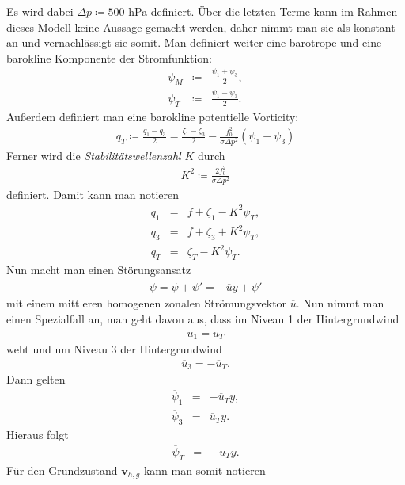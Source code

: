 \documentclass{book}
\newcommand\newoverline[1]{%
\overline{#1}}
\begin{document}
%
Es wird dabei $\Delta p \coloneqq500$ hPa definiert. Über die letzten Terme kann im Rahmen dieses Modell keine Aussage gemacht werden, daher nimmt man sie als konstant an und vernachlässigt sie somit. Man definiert weiter eine barotrope und eine barokline Komponente der Stromfunktion:
%
\begin{eqnarray}
\psi_M& \coloneqq&\frac{\psi_1 + \psi_3}{2},\\
\psi_T& \coloneqq&\frac{\psi_1 - \psi_3}{2}.
\end{eqnarray}
%
Außerdem definiert man eine barokline potentielle Vorticity:
%
\begin{eqnarray}
q_T \coloneqq\frac{q_1 - q_3}{2} = \frac{\zeta_1 - \zeta_3}{2} - \frac{f_0^2}{\sigma\Delta p^2}\left(\psi_1 - \psi_3\right)
\end{eqnarray}
%
Ferner wird die \textit{Stabilitätswellenzahl} $K$ durch
%
\begin{eqnarray}
K^2 \coloneqq\frac{2f_0^2}{\sigma\Delta p^2}
\end{eqnarray}
%
definiert. Damit kann man notieren
%
\begin{eqnarray}
q_1 & = & f + \zeta_1 - K^2\psi_T,\\
q_3 & = & f + \zeta_3 + K^2\psi_T,\\
q_T & = & \zeta_T - K^2\psi_T.
\end{eqnarray}
%
Nun macht man einen Störungsansatz
%
\begin{eqnarray}
\psi = \newoverline{\psi} + \psi' = -\newoverline{u}y + \psi'
\end{eqnarray}
%
mit einem mittleren homogenen zonalen Strömungsvektor $\newoverline{u}$. Nun nimmt man einen Spezialfall an, man geht davon aus, dass im Niveau 1 der Hintergrundwind
%
\begin{eqnarray}
\newoverline{u}_1 = \newoverline{u}_T
\end{eqnarray}
%
weht und um Niveau 3 der Hintergrundwind
%
\begin{eqnarray}
\newoverline{u}_3 = -\newoverline{u}_T.
\end{eqnarray}
%
Dann gelten
%
\begin{eqnarray}
\newoverline{\psi}_1 & = & -\newoverline{u}_Ty,\\
\newoverline{\psi}_3 & = & \newoverline{u}_Ty.
\end{eqnarray}
%
Hieraus folgt
%
\begin{eqnarray}
\newoverline{\psi}_T & = & -\newoverline{u}_Ty.
\end{eqnarray}
%
Für den Grundzustand $\newoverline{\mathbf{v}_{h, g}}$ kann man somit notieren
\end{document}
